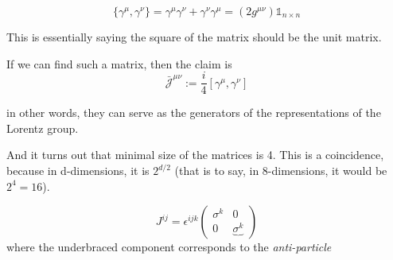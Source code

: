 \documentclass[11pt]{article}
\begin{document}
\[ \{ \gamma^\mu, \gamma^\nu \} = \gamma^\mu\gamma^\nu + \gamma^\nu\gamma^\mu =  (2g^{\mu\nu})\mathbb{1}_{n\times n} \]

This is essentially saying the square of the matrix should be the unit matrix.

If we can find such a matrix, then the claim is \[ \bar{\mathcal{J}}^{\mu\nu} := \frac{i}{4} [\gamma^\mu, \gamma^\nu]\]

in other words, they can serve as the generators of the representations of the Lorentz group.


And it turns out that minimal size of the matrices is 4. This is a coincidence, because in d-dimensions, it is $2^{d/2}$ (that is to say, in 8-dimensions, it would be $2^4 = 16$).


\[ J^{ij} = \epsilon^{ijk} \begin{pmatrix}
	\sigma^k & 0 \\ 0 & \underbrace{\sigma^k}
\end{pmatrix} \]
where the underbraced component corresponds to the \textit{anti-particle}
\end{document}
